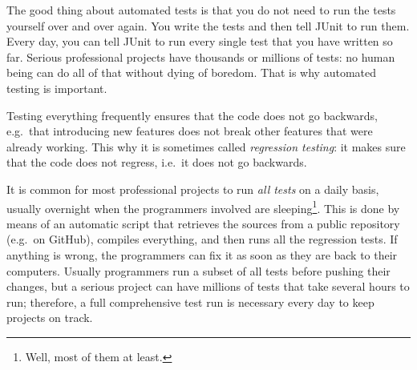 The good thing about automated tests is that you do not need to run
the tests yourself over and over again. You write the tests and then
tell JUnit to run them. Every day, you can tell JUnit to run every
single test that you have written so far. Serious professional
projects have thousands or millions of tests: no human being can do
all of that without dying of boredom. That is why automated testing is
important. 

Testing everything frequently ensures that the code does not go
backwards, e.g.~that introducing new features does not break other
features that were already working. This why it is sometimes called
\emph{regression testing}: it makes sure that the code does not
regress, i.e.~it does not go backwards. 

It is common for most professional projects to run \emph{all tests}
on a daily basis, usually overnight when the programmers involved are
sleeping\footnote{Well, most of them at least.}. This is done by means
of an automatic script that retrieves the sources from a public
repository (e.g.~on GitHub), compiles everything, and then runs all
the regression tests. If anything is wrong, the programmers can fix it
as soon as they are back to their computers. Usually programmers run
a subset of all tests before pushing their changes, but a serious
project can have millions of tests that take several hours to run;
therefore, a full comprehensive test run is necessary every day to
keep projects on track. 



